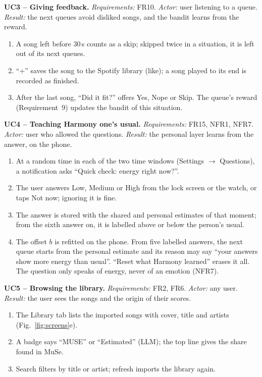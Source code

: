 \documentclass[conference]{IEEEtran}
\begin{document}
\textbf{UC3 -- Giving feedback.} \emph{Requirements:} FR10. \emph{Actor:} user listening to a queue. \emph{Result:} the next queues avoid disliked songs, and the bandit learns from the reward.
\begin{enumerate}
\item A song left before 30\,s counts as a skip; skipped twice in a situation, it is left out of its next queues.
\item ``+'' saves the song to the Spotify library (like); a song played to its end is recorded as finished.
\item After the last song, ``Did it fit?'' offers Yes, Nope or Skip. The queue's reward (Requirement~9) updates the bandit of this situation.
\end{enumerate}

\textbf{UC4 -- Teaching Harmony one's usual.} \emph{Requirements:} FR15, NFR1, NFR7. \emph{Actor:} user who allowed the questions. \emph{Result:} the personal layer learns from the answer, on the phone.
\begin{enumerate}
\item At a random time in each of the two time windows (Settings $\rightarrow$ Questions), a notification asks ``Quick check: energy right now?''.
\item The user answers Low, Medium or High from the lock screen or the watch, or taps Not now; ignoring it is fine.
\item The answer is stored with the shared and personal estimates of that moment; from the sixth answer on, it is labelled above or below the person's usual.
\item The offset $b$ is refitted on the phone. From five labelled answers, the next queue starts from the personal estimate and its reason may say ``your answers show more energy than usual''. ``Reset what Harmony learned'' erases it all. The question only speaks of energy, never of an emotion (NFR7).
\end{enumerate}

\textbf{UC5 -- Browsing the library.} \emph{Requirements:} FR2, FR6. \emph{Actor:} any user. \emph{Result:} the user sees the songs and the origin of their scores.
\begin{enumerate}
\item The Library tab lists the imported songs with cover, title and artists (Fig.~\ref{fig:screens}e).
\item A badge says ``MUSE'' or ``Estimated'' (LLM); the top line gives the share found in MuSe.
\item Search filters by title or artist; refresh imports the library again.
\end{enumerate}
\end{document}
